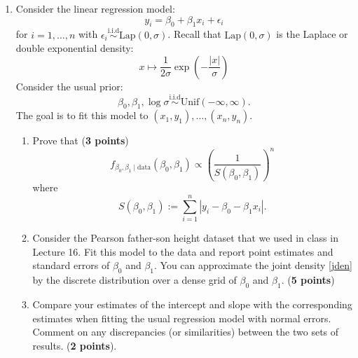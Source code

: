 \documentclass{scrartcl}
\begin{document}
\begin{enumerate}
\item Consider the linear regression model:
  \begin{equation*}
    y_i = \beta_0 + \beta_1 x_i + \epsilon_i 
  \end{equation*}
for $i = 1, \dots, n$ with $\epsilon_i \overset{\text{i.i.d}}{\sim}
\text{Lap}(0, \sigma)$. Recall that $\text{Lap}(0, \sigma)$ is the
Laplace or double exponential density:
\begin{equation*}
x \mapsto  \frac{1}{2 \sigma} \exp \left(-\frac{|x|}{\sigma} \right)
\end{equation*}
Consider the usual prior:
\begin{equation*}
  \beta_0, \beta_1, \log \sigma \overset{\text{i.i.d}}{\sim}
  \text{Unif}(-\infty, \infty). 
\end{equation*}
The goal is to fit this model to $(x_1, y_1),
\dots, (x_n, y_n)$. 
\begin{enumerate}
\item Prove that   (\textbf{3 points})
  \begin{equation}\label{jden}
    f_{\beta_0, \beta_1 \mid \text{data}}(\beta_0, \beta_1) \propto
    \left(\frac{1}{S(\beta_0, \beta_1)} \right)^n
  \end{equation}
  where
  \begin{equation*}
    S(\beta_0, \beta_1) := \sum_{i=1}^n |y_i - \beta_0 - \beta_1
    x_i|. 
  \end{equation*}
 \item Consider the Pearson  father-son  height dataset that we used
   in class in Lecture 16. Fit this model to the data and report point estimates
   and standard errors of $\beta_0$ and $\beta_1$. You can approximate
   the joint density \eqref{jden} by the discrete distribution over a
   dense grid of $\beta_0$ and $\beta_1$. (\textbf{5 points})
  \item Compare your estimates of the intercept and slope with the
    corresponding estimates when fitting the usual regression model
    with normal errors. Comment on any discrepancies (or similarities)
    between the two sets of results. (\textbf{2 points}). 
\end{enumerate}



\end{enumerate}
\end{document}

